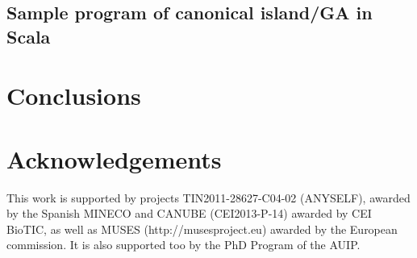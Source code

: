 \documentclass[9pt, technote]{IEEEtran}
\begin{document}
\subsection{Sample program of canonical island/GA in Scala}\label{sec:sample}


\section{Conclusions}
\label{sec:conclusions}
    


\section{Acknowledgements}

This work is supported by projects TIN2011-28627-C04-02 (ANYSELF),
awarded by the Spanish MINECO and CANUBE (CEI2013-P-14) awarded by CEI
BioTIC, as well as MUSES (http://musesproject.eu) awarded by the
European commission. It is also supported too by the PhD
Program of the AUIP.




\end{document}
